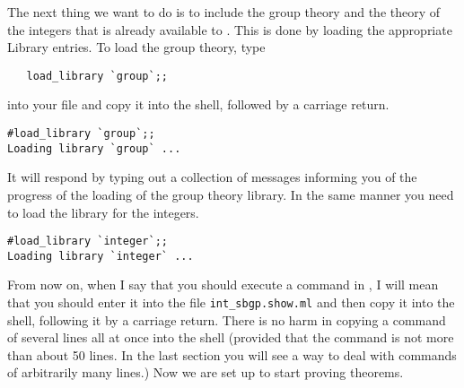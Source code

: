 The next thing we want to do is to include the group theory and the
theory of the integers that is already available to \HOL.  This is done
by loading the appropriate Library entries.  To load the group theory,
type
\begin{verbatim}
   load_library `group`;;
\end{verbatim}
into your file and copy it into the shell, followed by a carriage return.

\begin{session}
\begin{verbatim}
#load_library `group`;;
Loading library `group` ...
\end{verbatim}
\evdots
\end{session}

It will respond by typing out a collection of messages informing you
of the progress of the loading of the group theory library.  In the
same manner you need to load the library for the integers.

\begin{session}
\begin{verbatim}
#load_library `integer`;;
Loading library `integer` ...
\end{verbatim}
\evdots
\end{session}

From now on, when I say that you should execute a command in \HOL, I
will mean that you should enter it into the file
{\small\verb+int_sbgp.show.ml+} and then copy it into the shell,
following it by a carriage return.  There is no harm in copying a
command of several lines all at once into the shell (provided that the
command is not more than about 50 lines.  In the last section you will
see a way to deal with commands of arbitrarily many lines.)  Now we
are set up to start proving theorems.

